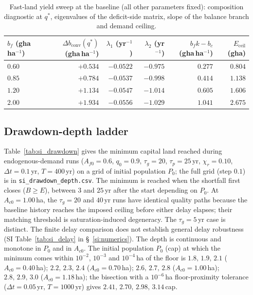 \documentclass[11pt,a4paper]{article}
\newcommand{\dconv}{\Delta b_{\mathrm{conv}}}
\newcommand{\Eceil}{E_{\mathrm{ceil}}}
\begin{document}
\begin{table}[htbp]
\centering\small
\caption{Fast-land yield sweep at the baseline (all other parameters fixed): composition diagnostic at $q^*$, eigenvalues of the deficit-side matrix, slope of the balance branch and demand ceiling.}
\label{tab:si_sweep}
\begin{tabular}{l r r r r r}
\toprule
$b_f$ (gha\,ha$^{-1}$) & $\dconv(q^*)$ (gha\,ha$^{-1}$) & $\lambda_1$ (yr$^{-1}$) & $\lambda_2$ (yr$^{-1}$) & $b_fk-b_c$ (gha\,ha$^{-1}$) & $\Eceil$ (gha) \\
\midrule
$0.60$ & $+0.534$ & $-0.0522$ & $-0.975$ & $0.277$ & $0.804$ \\
$0.85$ & $+0.784$ & $-0.0537$ & $-0.998$ & $0.414$ & $1.138$ \\
$1.20$ & $+1.134$ & $-0.0547$ & $-1.014$ & $0.605$ & $1.606$ \\
$2.00$ & $+1.934$ & $-0.0556$ & $-1.029$ & $1.041$ & $2.675$ \\
\bottomrule
\end{tabular}
\end{table}

\subsection{Drawdown-depth ladder}\label{si:ladder}

Table~\ref{tab:si_drawdown} gives the minimum capital land reached during endogenous-demand runs ($A_{f0}=0.6$, $q_0=0.9$, $\tau_g=20$, $\tau_p=25$\,yr, $\chi_r=0.10$, $\Delta t=0.1$\,yr, $T=400$\,yr) on a grid of initial population $P_0$; the full grid (step $0.1$) is in \texttt{si\_drawdown\_depth.csv}. The minimum is reached when the shortfall first closes ($B\ge E$), between $3$ and $25$\,yr after the start depending on $P_0$. At $A_{c0}=1.00$\,ha, the $\tau_g=20$ and $40$\,yr runs have identical quality paths because the baseline history reaches the imposed ceiling before either delay elapses; their matching threshold is saturation-induced degeneracy. The $\tau_g=5$\,yr case is distinct. The finite delay comparison does not establish general delay robustness (SI Table~\ref{tab:si_delay} in \S~\ref{si:numerics}). The depth is continuous and monotone in $P_0$ and in $A_{c0}$. The initial population $P_0$ (cap) at which the minimum comes within $10^{-2}$, $10^{-3}$ and $10^{-4}$\,ha of the floor is $1.8,\,1.9,\,2.1$ ($A_{c0}=0.40$\,ha); $2.2,\,2.3,\,2.4$ ($A_{c0}=0.70$\,ha); $2.6,\,2.7,\,2.8$ ($A_{c0}=1.00$\,ha); $2.8,\,2.9,\,3.0$ ($A_{c0}=1.18$\,ha); the bisection with a $10^{-6}$\,ha floor-proximity tolerance ($\Delta t=0.05$\,yr, $T=1000$\,yr) gives $2.41,\,2.70,\,2.98,\,3.14$\,cap. \par\pagebreak
\end{document}
